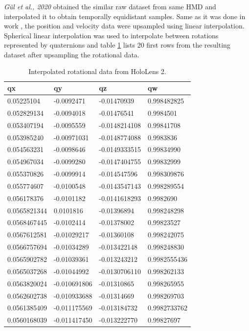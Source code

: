 \textit{Gül et al., 2020} obtained the similar raw dataset from same HMD and interpolated it to obtain temporally equidistant samples. Same as it was done in work \cite{serhan_kalman}, the position and velocity data were upsampled using linear interpolation. Spherical linear interpolation was used to interpolate between rotations represented by quaternions and  table \ref{tab:inter_data_rot} lists 20 first rows from the resulting dataset after upsampling the rotational data.

\begin{table}[!ht]
	\footnotesize
	\centering
	\begin{tabular}{|l|l|l|l|}
		\hline
		qx & qy & qz  & qw \\ [0.5ex] 
		\hline\hline
		0.05225104 & -0.0092471 & -0.01470939 & 0.998482825\\ \hline
		0.052829134 & -0.0094018 & -0.01476541 & 0.9984501\\ \hline
		0.053407194	& -0.0095559 & -0.0148214108 & 0.99841708 \\ \hline
		0.053985240 & -0.00971031 & -0.0148774088 & 0.9983836 \\ \hline
		0.054563231 & -0.0098646 & -0.0149333515 & 0.99834990 \\ \hline
		0.054967034 & -0.0099280 & -0.0147404755 & 0.99832999 \\ \hline
		0.055370826 & -0.0099914 & -0.014547596 & 0.998309876 \\ \hline
		0.055774607 & -0.0100548 & -0.0143547143 & 0.998289554 \\ \hline
		0.056178376 & -0.0101182 & -0.0141618293 & 0.9982690 \\ \hline
		0.0565821344 & 0.0101816 & -0.01396894 & 0.998248298 \\ \hline
		0.0568467445 & -0.0102414 & -0.01378002 & 0.99823527 \\ \hline
		0.0567612581 & -0.01029217 & -0.01360108 & 0.998242075 \\ \hline
		0.0566757694 & -0.01034289 & -0.013422148 & 0.998248830 \\ \hline
		0.0565902782 & -0.01039361 & -0.013243212 & 0.9982555436 \\ \hline
		0.0565037268 & -0.01044992 & -0.0130706110 & 0.998262133 \\ \hline
		0.0563820024 & -0.010691806 & -0.01310865 & 0.998265955 \\ \hline
		0.0562602738 & -0.010933688 & -0.01314669 & 0.998269703 \\ \hline
		0.0561385409 & -0.011175569 & -0.013184732 & 0.9982733762 \\ \hline
		0.0560168039 & -0.011417450 & -0.013222770 & 0.99827697 \\ \hline
	\end{tabular}
	\caption{\label{tab:inter_data_rot}Interpolated rotational data from HoloLens 2.}
\end{table}

